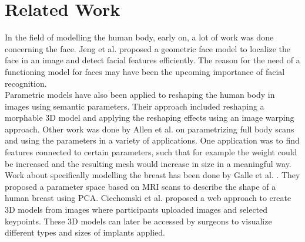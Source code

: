 \setcounter{chapter}{1}

\chapter{Related Work}
In the field of modelling the human body, early on, a lot of work was done concerning the face. Jeng et al. \cite{jeng1998facial} proposed a geometric face model to localize the face in an image and detect facial features efficiently. The reason for the need of a functioning model for faces may have been the upcoming importance of facial recognition.\\
Parametric models have also been applied to reshaping the human body in images using semantic parameters. \cite{zhou2010parametric} Their approach included reshaping a morphable 3D model and applying the reshaping effects using an image warping approach. Other work was done by Allen et al. \cite{allen2003space} on parametrizing full body scans and using the parameters in a variety of applications. One application was to find features connected to certain parameters, such that for example the weight could be increased and the resulting mesh would increase in size in a meaningful way.\\
Work about specifically modelling the breast has been done by Galle et al. \cite{gallo2010human}. They proposed a parameter space based on MRI scans to describe the shape of a human breast using PCA. Ciechomski et al. \cite{de2012development} proposed a web approach to create 3D models from images where participants uploaded images and selected keypoints. These 3D models can later be accessed by surgeons to visualize different types and sizes of implants applied.

